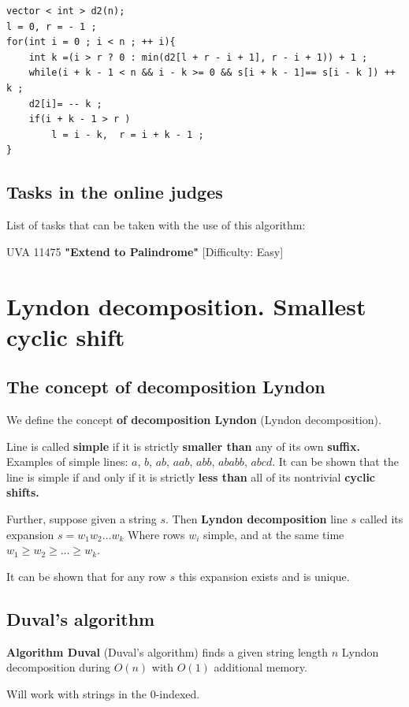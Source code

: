 \begin{verbatim}
vector < int > d2(n);
l = 0, r = - 1 ;
for(int i = 0 ; i < n ; ++ i){
    int k =(i > r ? 0 : min(d2[l + r - i + 1], r - i + 1)) + 1 ;
    while(i + k - 1 < n && i - k >= 0 && s[i + k - 1]== s[i - k ]) ++ k ;
    d2[i]= -- k ;
    if(i + k - 1 > r )
        l = i - k,  r = i + k - 1 ;
} 
\end{verbatim}
\subsection{ Tasks in the online judges }

List of tasks that can be taken with the use of this algorithm:

UVA 11475 \textbf{"Extend to Palindrome"} [Difficulty: Easy]
\section{ Lyndon decomposition. Smallest cyclic shift }
\subsection{ The concept of decomposition Lyndon }

We define the concept \textbf{of decomposition Lyndon} (Lyndon decomposition).

Line is called \textbf{simple} if it is strictly \textbf{smaller than} any of its own \textbf{suffix.} Examples of simple lines: $a$, $b$, $ab$, $aab$, $abb$, $ababb$, $abcd$. It can be shown that the line is simple if and only if it is strictly \textbf{less than} all of its nontrivial \textbf{cyclic shifts.}

Further, suppose given a string $s$. Then \textbf{Lyndon decomposition} line $s$ called its expansion $s = w_1 w_2 \ldots w_k$ Where rows $w_i$ simple, and at the same time $w_1 \ge w_2 \ge \ldots \ge w_k$.

It can be shown that for any row $s$ this expansion exists and is unique.

\subsection{ Duval's algorithm }

\textbf{Algorithm Duval} (Duval's algorithm) finds a given string length $n$ Lyndon decomposition during $O (n)$ with $O (1)$ additional memory.

Will work with strings in the 0-indexed.

